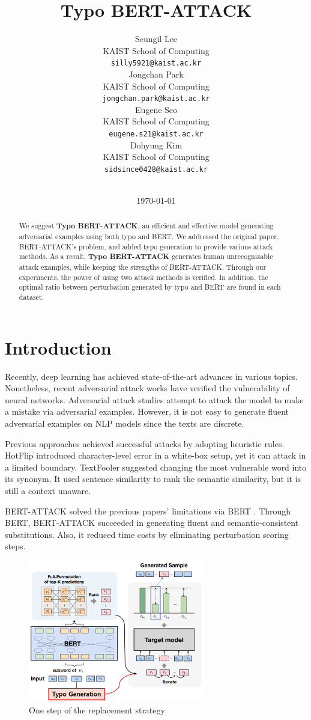 \documentclass[11pt,a4paper]{article}
\title{Typo BERT-ATTACK}
\author{Seungil Lee \\
  KAIST School of Computing\\
  \texttt{silly5921@kaist.ac.kr} \\\And
  Jongchan Park \\
  KAIST School of Computing\\
  \texttt{jongchan.park@kaist.ac.kr} \\\AND
  Eugene Seo \\
  KAIST School of Computing\\
  \texttt{eugene.s21@kaist.ac.kr} \\\And
  Dohyung Kim \\
  KAIST School of Computing\\
  \texttt{sidsince0428@kaist.ac.kr} \\\
  }
\date{\today}
\begin{document}
\maketitle
\begin{abstract}
We suggest \textbf{Typo BERT-ATTACK}, an efficient and effective model generating adversarial examples using both typo and BERT. We addressed the original paper, BERT-ATTACK’s problem, and added typo generation to provide various attack methods. As a result, \textbf{Typo BERT-ATTACK} generates human unrecognizable attack examples, while keeping the strengths of BERT-ATTACK. Through our experiments, the power of using two attack methods is verified. In addition, the optimal ratio between perturbation generated by typo and BERT are found in each dataset. 
\end{abstract}

\section{Introduction}

Recently, deep learning has achieved state-of-the-art advances in various topics. Nonetheless, recent adversarial attack works have verified the vulnerability of neural networks. Adversarial attack studies attempt to attack the model to make a mistake via adversarial examples. However, it is not easy to generate fluent adversarial examples on NLP models since the texts are discrete. 

Previous approaches achieved successful attacks by adopting heuristic rules. HotFlip \citep{HotFlip} introduced character-level error in a white-box setup, yet it can attack in a limited boundary. TextFooler \citep{TextFooler} suggested changing the most vulnerable word into its synonym. It used sentence similarity to rank the semantic similarity, but it is still a context unaware.

BERT-ATTACK \citep{BERT-ATTACK:20} solved the previous papers’ limitations via BERT \citep{BERT}. Through BERT, BERT-ATTACK succeeded in generating fluent and semantic-consistent substitutions. Also, it reduced time costs by eliminating perturbation scoring steps. 

\begin{figure}[htbp]
\centering
    \includegraphics[width=218.268pt]{figure1.png}
    \caption{One step of the replacement strategy} 
    \label{fig:Typo_BERT-ATTACK}
\end{figure}
\end{document}
